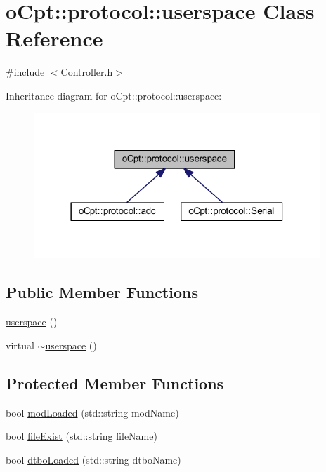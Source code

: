 \hypertarget{classo_cpt_1_1protocol_1_1userspace}{}\section{o\+Cpt\+:\+:protocol\+:\+:userspace Class Reference}
\label{classo_cpt_1_1protocol_1_1userspace}


{\ttfamily \#include $<$Controller.\+h$>$}



Inheritance diagram for o\+Cpt\+:\+:protocol\+:\+:userspace\+:
\nopagebreak
\begin{figure}[H]
\begin{center}
\leavevmode
\includegraphics[width=306pt]{classo_cpt_1_1protocol_1_1userspace__inherit__graph}
\end{center}
\end{figure}
\subsection*{Public Member Functions}
\begin{DoxyCompactItemize}
\item 
\hyperlink{classo_cpt_1_1protocol_1_1userspace_a845ca02e8c8613813d643c64e6e917c3}{userspace} ()
\item 
virtual \hyperlink{classo_cpt_1_1protocol_1_1userspace_ae97e147b38f9a48ca9389960b7378d25}{$\sim$userspace} ()
\end{DoxyCompactItemize}
\subsection*{Protected Member Functions}
\begin{DoxyCompactItemize}
\item 
bool \hyperlink{classo_cpt_1_1protocol_1_1userspace_aac8635fbc254fff76642cf6910484a02}{mod\+Loaded} (std\+::string mod\+Name)
\item 
bool \hyperlink{classo_cpt_1_1protocol_1_1userspace_a3c35e581abd2a06de6feb160e25ac35b}{file\+Exist} (std\+::string file\+Name)
\item 
bool \hyperlink{classo_cpt_1_1protocol_1_1userspace_ac5a9bd7fbdbc94edb7b3baaafabbe11e}{dtbo\+Loaded} (std\+::string dtbo\+Name)
\end{DoxyCompactItemize}
